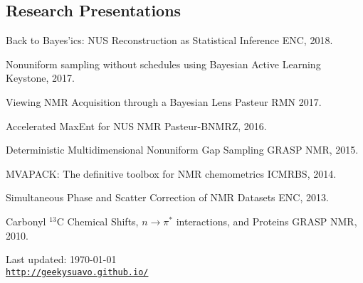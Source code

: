 \documentclass[letterpaper]{article}
\def\footerlink{http://geekysuavo.github.io/}
\renewenvironment{itemize}{
  \begin{list}{}{
    \setlength{\leftmargin}{1.5em}
  }
}{
  \end{list}
}
\begin{document}
\subsection*{Research Presentations}

\begin{itemize}
 \item Back to Bayes'ics: NUS Reconstruction as Statistical Inference
  \hfill ENC, 2018.

 \item Nonuniform sampling without schedules using Bayesian Active Learning
  \hfill Keystone, 2017.

 \item Viewing NMR Acquisition through a Bayesian Lens
  \hfill Pasteur RMN 2017.

 \item Accelerated MaxEnt for NUS NMR
  \hfill Pasteur-BNMRZ, 2016.

 \item Deterministic Multidimensional Nonuniform Gap Sampling
  \hfill GRASP NMR, 2015.

 \item MVAPACK: The definitive toolbox for NMR chemometrics
  \hfill ICMRBS, 2014.

 \item Simultaneous Phase and Scatter Correction of NMR Datasets
  \hfill ENC, 2013.

 \item Carbonyl $^{13}$C Chemical Shifts, $n\rightarrow\pi^*$ interactions,
  and Proteins \hfill GRASP NMR, 2010.
\end{itemize}

\bigskip

\begin{center}
  \begin{footnotesize}
    Last updated: \today \\
    \href{\footerlink}{\texttt{\footerlink}}
  \end{footnotesize}
\end{center}

\end{document}
